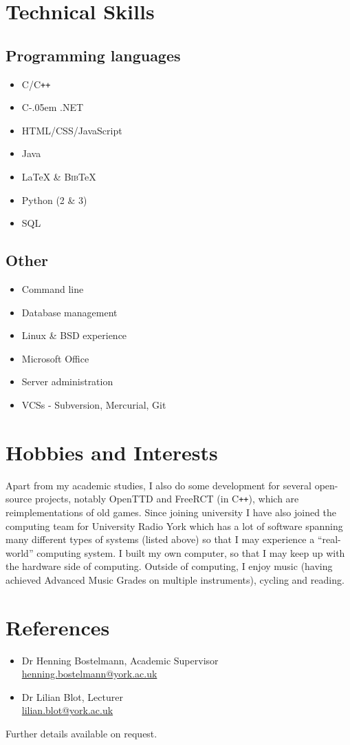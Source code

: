 \documentclass[11pt,a4paper]{article}
\newcommand{\email}[1]{\href{mailto:#1}{#1}}
\newcommand{\cpp}{C{}\texttt{++}}
\newcommand{\cs}{\settoheight{\dimen0}{C}C\kern-.05em \resizebox{!}{\dimen0}{\raisebox{\depth}{\textbf{\#}}}}
\begin{document}
\section*{Technical Skills}
\begin{minipage}[t]{.45\textwidth}
\subsection*{Programming languages}
\begin{itemize}
  \item C/\cpp
  \item \cs.NET
  \item HTML/CSS/JavaScript
  \item Java
  \item \LaTeX{} \& \textsc{Bib}\TeX
  \item Python (2 \& 3)
  \item SQL
\end{itemize}
\end{minipage}
\hspace{0.5cm}
\begin{minipage}[t]{.45\textwidth}
\subsection*{Other}
\begin{itemize}
  \item Command line
  \item Database management
  \item Linux \& BSD experience
  \item Microsoft Office
  \item Server administration
  \item VCSs - Subversion, Mercurial, Git
\end{itemize}
\end{minipage}

\section*{Hobbies and Interests}
Apart from my academic studies, I also do some development for several
open-source projects, notably OpenTTD and FreeRCT (in \cpp), which are
reimplementations of old games. Since joining university I have also joined the
computing team for University Radio York which has a lot of software spanning
many different types of systems (listed above) so that I may experience a
``real-world'' computing system. I built my own computer, so that I may keep
up with the hardware side of computing. Outside of computing, I enjoy music
(having achieved Advanced Music Grades on multiple instruments), cycling and
reading.

\section*{References}

\begin{itemize}[label={}]
\item Dr Henning Bostelmann, Academic Supervisor \hfill \\
  \indent \email{henning.bostelmann@york.ac.uk}
\item Dr Lilian Blot, Lecturer \hfill \\
  \indent \email{lilian.blot@york.ac.uk}
\end{itemize}

Further details available on request.
\end{document}
